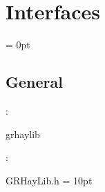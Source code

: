
\section{Interfaces} 


\parskip = 0pt

\vspace{3mm} \subsection*{General}

: 

grhaylib
\vspace{2mm}

\vspace{5mm}

: 



GRHayLib.h
\vspace{2mm}\parskip = 10pt 
